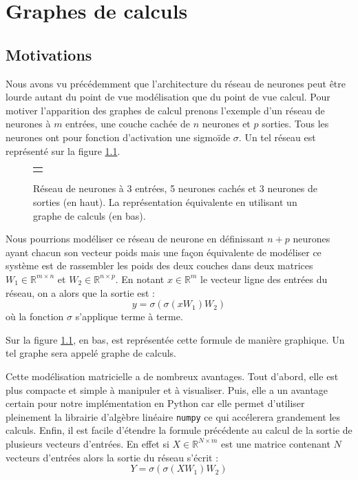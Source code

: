\chapter{Graphes de calculs}

\section{Motivations}

Nous avons vu précédemment que l'architecture du réseau de neurones peut être lourde autant du point de vue modélisation que du point de vue calcul. Pour motiver l'apparition des graphes de calcul prenons l'exemple d'un réseau de neurones à $m$ entrées, une couche cachée de $n$ neurones et $p$ sorties. Tous les neurones ont pour fonction d'activation une sigmoïde $\sigma$. Un tel réseau est représenté sur la figure \ref{reseau_3_5_3}.

\begin{figure}
\begin{center}
\begin{tabular}{c}
 \\
 \\
\end{tabular}
\end{center}
\caption{Réseau de neurones à 3 entrées, 5 neurones cachés et 3 neurones de sorties (en haut). La représentation équivalente en utilisant un graphe de calculs (en bas).}
\label{reseau_3_5_3}
\end{figure}

Nous pourrions modéliser ce réseau de neurone en définissant $n+p$ neurones ayant chacun son vecteur poids mais une façon équivalente de modéliser ce système est de rassembler les poids des deux couches dans deux matrices $W_1 \in \mathbb{R}^{m \times n}$ et $W_2 \in \mathbb{R}^{n \times p}$. En notant $x \in \mathbb{R}^m$ le vecteur ligne des entrées du réseau, on a alors que la sortie est :
\begin{equation}
y = \sigma(\sigma(xW_1)W_2)
\label{eq_3_5_3}
\end{equation}
où la fonction $\sigma$ s'applique terme à terme. 

Sur la figure \ref{reseau_3_5_3}, en bas, est représentée cette formule de manière graphique. Un tel graphe sera appelé graphe de calculs.

Cette modélisation matricielle a de nombreux avantages. Tout d'abord, elle est plus compacte et simple à manipuler et à visualiser. Puis, elle a un avantage certain pour notre implémentation en Python car elle permet d'utiliser pleinement la librairie d'algèbre linéaire \texttt{numpy} ce qui accélerera grandement les calculs. Enfin, il est facile d'étendre la formule précédente au calcul de la sortie de plusieurs vecteurs d'entrées. En effet si $X \in \mathbb{R}^{N \times m}$ est une matrice contenant $N$ vecteurs d'entrées alors la sortie du réseau s'écrit :
$$Y = \sigma(\sigma(XW_1)W_2)$$

